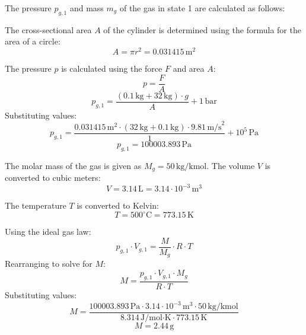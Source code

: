 The pressure \( p_{g,1} \) and mass \( m_g \) of the gas in state 1 are calculated as follows:  

The cross-sectional area \( A \) of the cylinder is determined using the formula for the area of a circle:  
\[
A = \pi r^2 = 0.031415 \, \text{m}^2
\]  

The pressure \( p \) is calculated using the force \( F \) and area \( A \):  
\[
p = \frac{F}{A}
\]  
\[
p_{g,1} = \frac{(0.1 \, \text{kg} + 32 \, \text{kg}) \cdot g}{A} + 1 \, \text{bar}
\]  
Substituting values:  
\[
p_{g,1} = \frac{0.031415 \, \text{m}^2 \cdot (32 \, \text{kg} + 0.1 \, \text{kg}) \cdot 9.81 \, \text{m/s}^2}{1} + 10^5 \, \text{Pa}
\]  
\[
p_{g,1} = 100003.893 \, \text{Pa}
\]  

The molar mass of the gas is given as \( M_g = 50 \, \text{kg/kmol} \). The volume \( V \) is converted to cubic meters:  
\[
V = 3.14 \, \text{L} = 3.14 \cdot 10^{-3} \, \text{m}^3
\]  

The temperature \( T \) is converted to Kelvin:  
\[
T = 500^\circ\text{C} = 773.15 \, \text{K}
\]  

Using the ideal gas law:  
\[
p_{g,1} \cdot V_{g,1} = \frac{M}{M_g} \cdot R \cdot T
\]  
Rearranging to solve for \( M \):  
\[
M = \frac{p_{g,1} \cdot V_{g,1} \cdot M_g}{R \cdot T}
\]  
Substituting values:  
\[
M = \frac{100003.893 \, \text{Pa} \cdot 3.14 \cdot 10^{-3} \, \text{m}^3 \cdot 50 \, \text{kg/kmol}}{8.314 \, \text{J/mol·K} \cdot 773.15 \, \text{K}}
\]  
\[
M = 2.44 \, \text{g}
\]